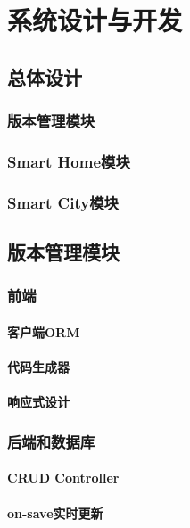 
\chapter{系统设计与开发}
\label{chap:design_and_implement}

\section{总体设计}
\subsection{版本管理模块}
\subsection{Smart Home模块}
\subsection{Smart City模块}
\section{版本管理模块}
\subsection{前端}
\subsubsection{客户端ORM}
\subsubsection{代码生成器}
\subsubsection{响应式设计}
\subsection{后端和数据库}
\subsubsection{CRUD Controller}
\subsubsection{on-save实时更新}
